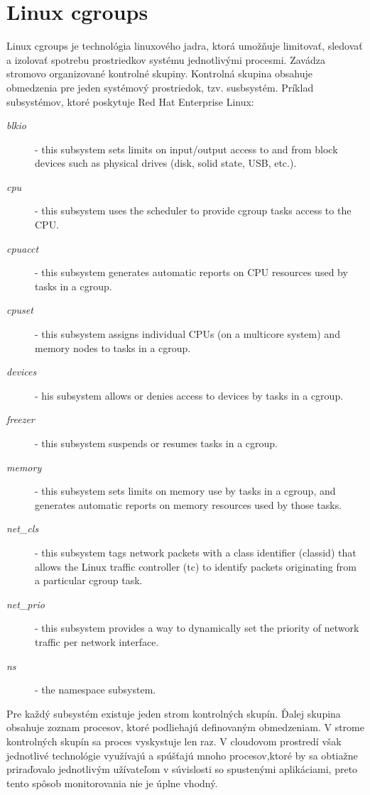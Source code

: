 \documentclass[11pt,final,oneside]{fithesis}
\begin{document}
\section{Linux cgroups}
Linux cgroups je technológia linuxového jadra, ktorá umožňuje limitovať, sledovať a izolovať spotrebu prostriedkov systému jednotlivými procesmi. Zavádza stromovo organizované kontrolné skupiny. 
Kontrolná skupina obsahuje obmedzenia pre jeden systémový prostriedok, tzv. susbsystém. Príklad subsystémov, ktoré poskytuje Red Hat Enterprise Linux: 
\begin{description}
\item[\emph{blkio}] - this subsystem sets limits on input/output access to and from block devices such as physical drives (disk, solid state, USB, etc.).
\item[\emph{cpu}] - this subsystem uses the scheduler to provide cgroup tasks access to the CPU.
\item[\emph{cpuacct}] - this subsystem generates automatic reports on CPU resources used by tasks in a cgroup.
\item[\emph{cpuset}] - this subsystem assigns individual CPUs (on a multicore system) and memory nodes to tasks in a cgroup.
\item[\emph{devices}] - his subsystem allows or denies access to devices by tasks in a cgroup.
\item[\emph{freezer}] - this subsystem suspends or resumes tasks in a cgroup.
\item[\emph{memory}] - this subsystem sets limits on memory use by tasks in a cgroup, and generates automatic reports on memory resources used by those tasks.
\item[\emph{net\_cls}] - this subsystem tags network packets with a class identifier (classid) that allows the Linux traffic controller (tc) to identify packets originating from a particular cgroup task.
\item[\emph{net\_prio}] - this subsystem provides a way to dynamically set the priority of network traffic per network interface.
\item[\emph{ns}] - the namespace subsystem.
\end{description}

Pre každý subsystém existuje jeden strom kontrolných skupín. Ďalej skupina obsahuje zoznam procesov, ktoré podliehajú definovaným obmedzeniam. V strome kontrolných skupín sa proces vyskystuje len raz.
V cloudovom prostredí však jednotlivé technológie využívajú a spúšťajú mnoho procesov,ktoré by sa obtiažne priraďovalo jednotlivým užívateľom v súvislosti so spustenými aplikáciami, preto tento spôsob
monitorovania nie je úplne vhodný.
\end{document}
